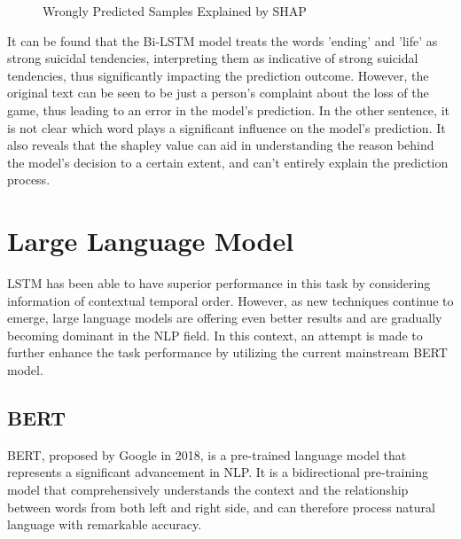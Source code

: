 \documentclass[ %
                    author={Bocheng Wang},
                supervisor={Dr. Qiang Liu},
                    degree={MSc},
                     title={A Research on Identification of Suicide Ideation in Texts with Multiple Models},
                      type={},
                      year={2024}]{dissertation}
\begin{document}
\begin{figure}[h]
      \centering
      \hfil
      \caption{Wrongly Predicted Samples Explained by SHAP}
      \label{fig:lstmshap}
\end{figure}

It can be found that the Bi-LSTM model treats the words 'ending' and 'life' as strong suicidal tendencies, interpreting them as indicative of strong suicidal tendencies, thus significantly impacting the prediction outcome. However, the original text can be seen to be just a person's complaint about the loss of the game, thus leading to an error in the model's prediction. In the other sentence, it is not clear which word plays a significant influence on the model's prediction. It also reveals that the shapley value can aid in understanding the reason behind the model's decision to a certain extent, and can't entirely explain the prediction process.

\section{Large Language Model}
\noindent
LSTM has been able to have superior performance in this task by considering information of contextual temporal order. However, as new techniques continue to emerge, large language models are offering even better results and are gradually becoming dominant in the NLP field. In this context, an attempt is made to further enhance the task performance by utilizing the current mainstream BERT model.

\subsection{BERT}
\noindent
BERT, proposed by Google in 2018\cite{devlin2018bert}, is a pre-trained language model that represents a significant advancement in NLP. It is a bidirectional pre-training model that comprehensively understands the context and the relationship between words from both left and right side, and can therefore process natural language with remarkable accuracy.
\end{document}

